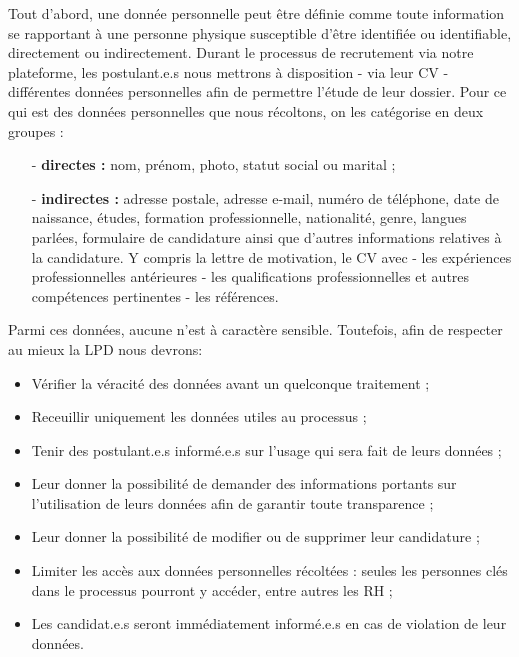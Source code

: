 Tout d'abord, une donnée personnelle peut être définie comme toute information se rapportant à une personne physique susceptible d'être identifiée ou identifiable, directement ou indirectement.  Durant le processus de recrutement via notre plateforme, les postulant.e.s nous mettrons à disposition - via leur CV - différentes données personnelles afin de permettre l'étude de leur dossier. Pour ce qui est des données personnelles que nous récoltons, on les catégorise en deux groupes :\newline

\begin{enumerate}
\item[-] \textbf{directes :} nom, prénom, photo, statut social ou marital ; \\
\item[-] \textbf{indirectes :} adresse postale, adresse e-mail, numéro de téléphone, date de naissance, études, formation professionnelle, nationalité, genre, langues parlées, formulaire de candidature ainsi que d'autres informations relatives à la candidature. Y compris la lettre de motivation, le CV avec - les expériences professionnelles antérieures - les qualifications professionnelles et autres compétences pertinentes - les références.\\
\end{enumerate}

Parmi ces données, aucune n'est à caractère sensible. Toutefois, afin de respecter au mieux la LPD nous devrons:\newline

\begin{itemize}
    \item Vérifier la véracité des données avant un quelconque traitement ;\\
    \item Receuillir uniquement les données utiles au processus ;\\
    \item Tenir des postulant.e.s informé.e.s sur l'usage qui sera fait de leurs données ;\\
    \item Leur donner la possibilité de demander des informations portants sur l'utilisation de leurs données afin de garantir toute transparence ;\\
    \item Leur donner la possibilité de modifier ou de supprimer leur candidature ;\\
    \item Limiter les accès aux données personnelles récoltées : seules les personnes clés dans le processus pourront y accéder, entre autres les RH ;\\
    \item Les candidat.e.s seront immédiatement informé.e.s en cas de violation de leur données. \\
\end{itemize}

